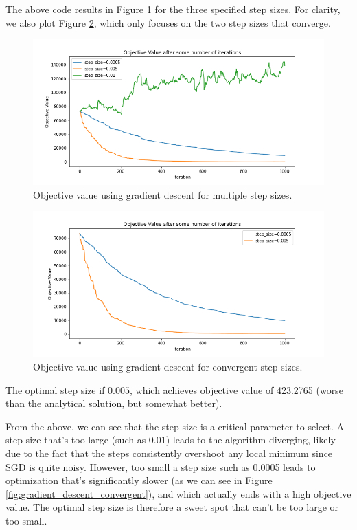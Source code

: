 \documentclass[12pt]{article}
\begin{document}
\begin{enumerate}[label=(\alph*)]
    The above code results in Figure \ref{fig:sgd_all} for the three specified step sizes. For clarity, we also plot Figure \ref{fig:sgd_convergent}, which only focuses on the two step sizes that converge.
    \begin{figure}[!ht]
      \centering
      \includegraphics[scale=0.5]{figures/sgd_all.png}
      \caption{Objective value using gradient descent for multiple step sizes.}
      \label{fig:sgd_all}
    \end{figure}
    \begin{figure}[!ht]
      \centering
      \includegraphics[scale=0.5]{figures/sgd_converge.png}
      \caption{Objective value using gradient descent for convergent step sizes.}
      \label{fig:sgd_convergent}
    \end{figure}

    The optimal step size if $0.005$, which achieves objective value of 423.2765 (worse than the analytical solution, but somewhat better).


    From the above, we can see that the step size is a critical parameter to select. A step size that's too large (such as 0.01) leads to the algorithm diverging, likely due to the fact that the steps consistently overshoot any local minimum since SGD is quite noisy. However, too small a step size such as 0.0005 leads to optimization that's significantly slower (as we can see in Figure \ref{fig:gradient_descent_convergent}), and which actually ends with a high objective value. The optimal step size is therefore a sweet spot that can't be too large or too small.

\end{enumerate}
\end{document}
